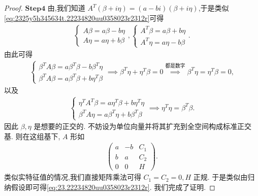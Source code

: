 \documentclass[../../main.tex]{subfiles}
\begin{document}
\begin{proof}
$\mathbf{Step}\mathbf{4}$  由,我们知道 $A^T(\beta + i\eta) = (a - bi)(\beta + i\eta)$,于是类似\eqref{eq:2325y5h345634t.22234820uu0358023r2312r}可得
\begin{align*}
\begin{cases} 
A\beta = a\beta - b\eta \\
A\eta = a\eta + b\beta 
\end{cases},
\begin{cases} 
A^T\beta = a\beta + b\eta \\
A^T\eta = a\eta - b\beta 
\end{cases}.
\end{align*}
由此可得
\begin{align*}
\begin{cases} 
\beta^TA\beta = a\beta^T\beta - b\beta^T\eta \\
\beta^TA\beta = a\beta^T\beta + b\eta^T\beta 
\end{cases}
\implies \beta^T\eta + \eta^T\beta = 0 \stackrel{\text{都是数字}}{\implies} \beta^T\eta = \eta^T\beta = 0,
\end{align*}
以及
\begin{align*}
\begin{cases} 
\eta^TA^T\beta = a\eta^T\beta + b\eta^T\eta \\
\beta^TA\eta = a\beta^T\eta + b\beta^T\beta 
\end{cases}
\implies \eta^T\eta = \beta^T\beta.
\end{align*}
因此 $\beta,\eta$ 是想要的正交的. 不妨设为单位向量并将其扩充到全空间构成标准正交基. 则在这组基下, $A$ 形如
\begin{align*}
\begin{pmatrix} a & -b & C_1 \\ b & a & C_2 \\ 0 & 0 & H \end{pmatrix}.
\end{align*}
类似实特征值的情况,我们直接矩阵乘法可得 $C_1 = C_2 = 0, H$ 正规. 于是类似由归纳假设即可得\eqref{eq:23.22234820uu0358023r2312r}. 我们完成了证明.

\end{proof}
\end{document}
